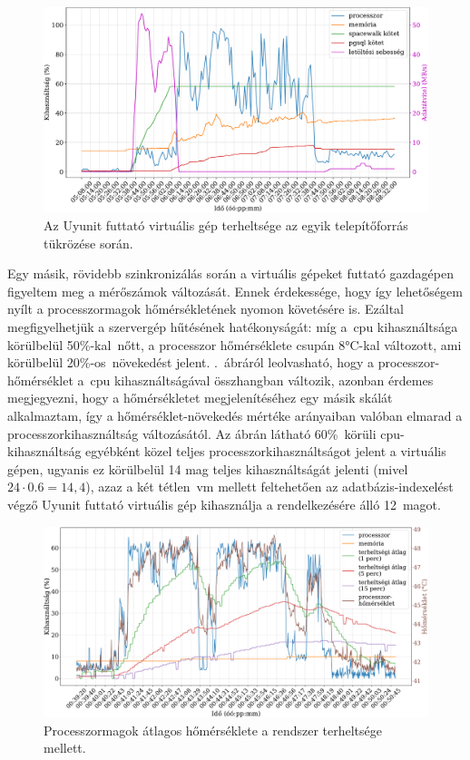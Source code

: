 \begin{figure}[ht]
	\centering
	\includegraphics[width=15cm]{figures/reposync-leap-oss-grid.pdf}
	\caption{Az Uyunit futtató virtuális gép terheltsége az egyik telepítőforrás tükrözése során.}
	\label{fig:reposync-chart}
\end{figure}

Egy másik, rövidebb szinkronizálás során a virtuális gépeket futtató gazdagépen figyeltem meg a mérőszámok változását. Ennek érdekessége, hogy így lehetőségem nyílt a processzormagok hőmérsékletének nyomon követésére is. Ezáltal megfigyelhetjük a szervergép hűtésének hatékonyságát: míg a~\acrshort{cpu} kihasználtsága körülbelül 50\%-kal~nőtt, a processzor hőmérséklete csupán 8°C-kal változott, ami körülbelül 20\%-os~növekedést jelent. .~ábráról leolvasható, hogy a processzor-hőmérséklet a~\acrshort{cpu} kihasználtságával összhangban változik, azonban érdemes megjegyezni, hogy a hőmérsékletet megjelenítéséhez egy másik skálát alkalmaztam, így a hőmérséklet-növekedés mértéke arányaiban valóban elmarad a processzorkihasználtság változásától. Az ábrán látható 60\%~körüli \acrshort{cpu}-kihasználtság egyébként közel teljes processzorkihasználtságot jelent a virtuális gépen, ugyanis ez körülbelül 14 mag teljes kihasználtságát jelenti (mivel $ 24 \cdot 0.6  = 14,4 $), azaz a két tétlen~\acrshort{vm} mellett feltehetően az adatbázis-indexelést végző Uyunit futtató virtuális gép kihasználja a rendelkezésére álló 12~magot.

\begin{figure}[ht]
	\centering
	\includegraphics[width=15cm]{figures/reposync-vhost-cputemp.pdf}
	\caption{Processzormagok átlagos hőmérséklete a rendszer terheltsége mellett.}
	\label{fig:reposync-vhost-cputemp}
\end{figure}

